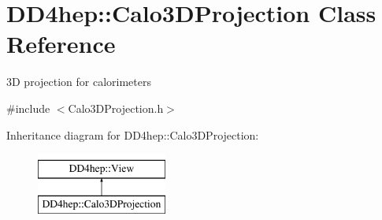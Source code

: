 \hypertarget{class_d_d4hep_1_1_calo3_d_projection}{}\section{D\+D4hep\+:\+:Calo3\+D\+Projection Class Reference}
\label{class_d_d4hep_1_1_calo3_d_projection}


3D projection for calorimeters  




{\ttfamily \#include $<$Calo3\+D\+Projection.\+h$>$}

Inheritance diagram for D\+D4hep\+:\+:Calo3\+D\+Projection\+:\begin{figure}[H]
\begin{center}
\leavevmode
\includegraphics[height=2.000000cm]{class_d_d4hep_1_1_calo3_d_projection}
\end{center}
\end{figure}
